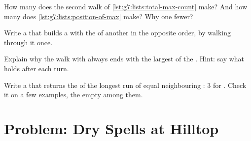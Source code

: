 \begin{exercise}[$\star\star$]\label{exo:g7:lists:9}
How many   does the second walk of
\cref{lst:g7:lists:total-max-count} make? And how many  does
\cref{lst:g7:lists:position-of-max} make? Why one fewer?
\end{exercise}

\begin{exercise}[$\star\star\star$]\label{exo:g7:lists:10}
Write a  that builds a  with the  of another  in the
opposite order, by walking through it once.
\end{exercise}

\begin{exercise}[$\star\star\star$]\label{exo:g7:lists:11}
Explain why the walk with  always ends with the largest  of
the . Hint: say what  holds after each turn.
\end{exercise}

\begin{exercise}[$\star\star\star$]\label{exo:g7:lists:12}
Write a   that returns the  of the
longest run of equal neighbouring : 3 for \code{[1, 2, 2, 2, 5, 5]}. Check
it on a few examples, the empty  among them.
\end{exercise}

\section{Problem: Dry Spells at Hilltop}

